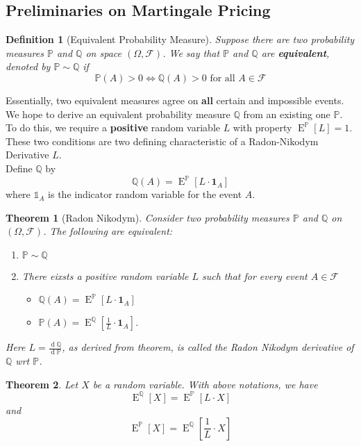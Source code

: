 \documentclass[12pt]{article}
\newtheorem{definition}{Definition}[section]
\newtheorem{theorem}{Theorem}[section]
\theoremstyle{definition}
\DeclareMathOperator{\diff}{d}
\DeclareMathOperator{\expec}{E}
\begin{document}
\subsection{Preliminaries on Martingale Pricing}
\begin{definition}[Equivalent Probability Measure]
\normalfont Suppose there are two probability measures $\mathbb{P}$ and $\mathbb{Q}$ on space $(\Omega, \mathcal{F})$. We say that $\mathbb{P}$ and $\mathbb{Q}$ are \textbf{equivalent}, denoted by $\mathbb{P}\sim \mathbb{Q}$ if
\[
\mathbb{P}(A)>0\Leftrightarrow \mathbb{Q}(A)>0\text{  for all }A\in\mathcal{F}
\]
\end{definition}
Essentially, two equivalent measures agree on \textbf{all} certain and impossible events.\\
We hope to derive an equivalent probability measure $\mathbb{Q}$ from an existing one $\mathbb{P}$. To do this, we require a \textbf{positive} random variable $L$ with property $\expec^{\mathbb{P}}[L]=1$. These two conditions are two defining characteristic of a Radon-Nikodym Derivative $L$.\\
Define $\mathbb{Q}$ by
\[
\mathbb{Q}(A)=\expec^{\mathbb{P}}[L\cdot \mathbf{1}_A]
\]
where $\mathbb{1}_A$ is the indicator random variable for the event $A$.
\begin{theorem}[Radon Nikodym]
\normalfont Consider two probability measures $\mathbb{P}$ and $\mathbb{Q}$ on $(\Omega, \mathcal{F})$. The following are equivalent:
\begin{enumerate}
  \item $\mathbb{P}\sim\mathbb{Q}$
  \item There eixsts a positive random variable $L$ such that for every event $A\in\mathcal{F}$
  \begin{itemize}
    \item $\mathbb{Q}(A)=\expec^\mathbb{P}[L\cdot \mathbf{1}_A]$
    \item $\mathbb{P}(A)=\expec^\mathbb{Q}[\frac{1}{L}\cdot \mathbf{1}_A]$.
  \end{itemize}
\end{enumerate}
Here $L=\frac{\diff \mathbb{Q}}{\diff \mathbb{P}}$, as derived from theorem, is called the Radon Nikodym derivative of $\mathbb{Q}$ wrt $\mathbb{P}$.
\end{theorem}
\begin{theorem}
\normalfont Let $X$ be a random variable. With above notations, we have
\[
\expec^\mathbb{Q}[X]=\expec^\mathbb{P}[L\cdot X]
\]
and
\[
\expec^\mathbb{P}[X]=\expec^\mathbb{Q}[\frac{1}{L}\cdot X]
\]
\end{theorem}
\end{document}
